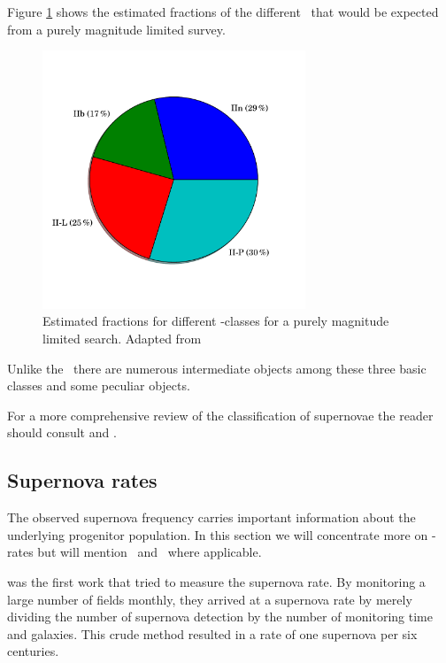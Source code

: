 Figure \ref{fig:ii_fracs} shows the estimated fractions of the different \sneii\ that would be expected from a purely magnitude limited survey.

\begin{figure}[htbp] %
   \centering
   \includegraphics[width=0.7\textwidth, trim=0 2.5cm 0 0cm]{chapter_intro/plots/plot_ii_fracs.pdf} 
   \caption{Estimated fractions for different -classes for a purely magnitude limited search. Adapted from \citet{2011MNRAS.412.1441L}}
   \label{fig:ii_fracs}
\end{figure}


Unlike the \sneia\ there are numerous intermediate objects among these three basic classes and some peculiar objects.


For a more comprehensive review of the classification of supernovae the reader should consult \citet{2003LNP...598...21T} and \citet{2007AIPC..937..187T}.

\subsection{Supernova rates}
\label{sec:sn_rates}
The observed supernova frequency carries important information about the underlying progenitor population. In this section we will concentrate more on \sneia-rates but will mention \sneii\ and \sneibc\ where applicable.

\citet{1938ApJ....88..529Z} was the first work that tried to measure the supernova rate. By monitoring a large number of fields monthly, they arrived at a supernova rate by merely dividing the number of supernova detection by the number of monitoring time and galaxies. This crude method resulted in a rate of one supernova per six centuries. 

